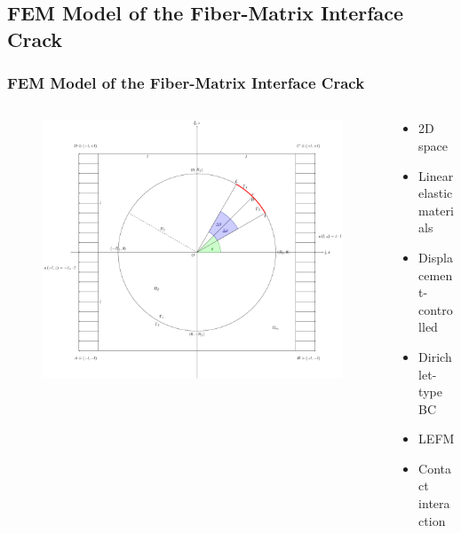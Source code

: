 \documentclass[first,firstsupp,lastsupp,handout,last,hyperref,table]{ETHclass}
\begin{document}
\subsection{FEM Model of the Fiber-Matrix Interface Crack}

\begin{frame}
\frametitle{\small FEM Model of the Fiber-Matrix Interface Crack}
\vspace{-0.5cm}
\centering
\begin{columns}
\begin{column}{0.7\textwidth}
\begin{figure}
\includegraphics[width=\columnwidth]{FEMfiberMatrixInterfaceProblem.pdf}
  \label{fig:jintegral}
\end{figure}
\end{column}
\begin{column}{0.3\textwidth}
\scriptsize
\begin{itemize}[label=]
\item 2D space
\item Linear elastic materials
\item Displacement-controlled
\item Dirichlet-type BC
\item LEFM
\item Contact interaction
\end{itemize}
\end{column}
\end{columns}
\end{frame}
\end{document}
